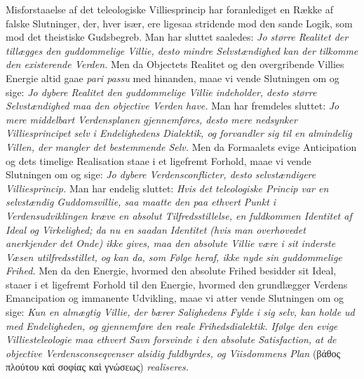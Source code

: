 \documentclass[12pt]{book}
\newcommand{\opage}[1]{\marginnote{\footnotesize\textit{[#1]}}}
\begin{document}
\opage{238} Misforstaaelse af det teleologiske Villiesprincip har foranlediget
en Række af falske Slutninger, der, hver især, ere ligesaa
stridende mod den sande Logik, som mod det theistiske Gudsbegreb.
Man har sluttet saaledes: \emph{Jo større Realitet der tillægges
den guddommelige Villie, desto mindre Selvstændighed kan der
tilkomme den existerende Verden.} Men da Objectets Realitet og den
overgribende Villies Energie altid gaae \textit{pari passu} med
hinanden, maae vi vende Slutningen om og sige: \emph{Jo dybere
Realitet den guddommelige Villie indeholder, desto større
Selvstændighed maa den objective Verden have.} Man har fremdeles
sluttet: \emph{Jo mere middelbart Verdensplanen gjennemføres, desto
mere nedsynker Villiesprincipet selv i Endelighedens Dialektik, og
forvandler sig til en almindelig Villen, der mangler det
bestemmende Selv.} Men da Formaalets evige Anticipation og dets
timelige Realisation staae i et ligefremt Forhold, maae vi vende
Slutningen om og sige: \emph{Jo dybere Verdensconflicter, desto
selvstændigere Villiesprincip.} Man har endelig sluttet: \emph{Hvis
det teleologiske Princip var en selvstændig Guddomsvillie, saa
maatte den paa ethvert Punkt i Verdensudviklingen kræve en absolut
Tilfredsstillelse, en fuldkommen Identitet af Ideal og
Virkelighed; da nu en saadan Identitet (hvis man overhovedet
anerkjender det Onde) ikke gives, maa den absolute Villie være i
sit inderste Væsen utilfredsstillet, og kan da, som Følge heraf,
ikke nyde sin guddommelige Frihed.} Men da den Energie, hvormed den
absolute Frihed besidder sit Ideal, staaer i et ligefremt Forhold
til den
\opage{239} Energie, hvormed den grundlægger Verdens Emancipation og immanente
Udvikling, maae vi atter vende Slutningen om og sige: \emph{Kun en
almægtig Villie, der bærer Salighedens Fylde i sig selv, kan holde
ud med Endeligheden, og gjennemføre den reale Frihedsdialektik.
Ifølge den evige Villiesteleologie maa ethvert Savn forsvinde i den
absolute Satisfaction, at de objective Verdensconseqvenser alsidig
fuldbyrdes, og Viisdommens Plan} (βάθος πλούτου καὶ σοφίας καὶ
γνώσεως) \emph{realiseres.}
\end{document}
